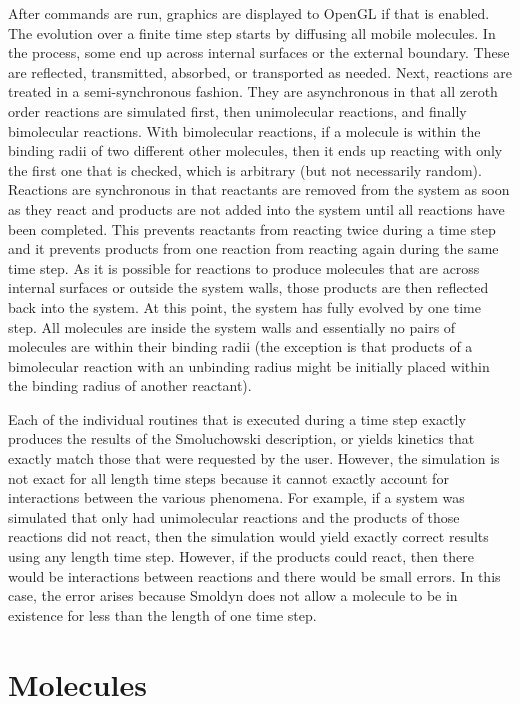 \documentclass {scrbook}
\begin{document}
After commands are run, graphics are displayed to OpenGL if that is enabled. The evolution over a finite time step starts by diffusing all mobile molecules. In the process, some end up across internal surfaces or the external boundary. These are reflected, transmitted, absorbed, or transported as needed. Next, reactions are treated in a semi-synchronous fashion. They are asynchronous in that all zeroth order reactions are simulated first, then unimolecular reactions, and finally bimolecular reactions. With bimolecular reactions, if a molecule is within the binding radii of two different other molecules, then it ends up reacting with only the first one that is checked, which is arbitrary (but not necessarily random). Reactions are synchronous in that reactants are removed from the system as soon as they react and products are not added into the system until all reactions have been completed. This prevents reactants from reacting twice during a time step and it prevents products from one reaction from reacting again during the same time step. As it is possible for reactions to produce molecules that are across internal surfaces or outside the system walls, those products are then reflected back into the system. At this point, the system has fully evolved by one time step. All molecules are inside the system walls and essentially no pairs of molecules are within their binding radii (the exception is that products of a bimolecular reaction with an unbinding radius might be initially placed within the binding radius of another reactant).

Each of the individual routines that is executed during a time step exactly produces the results of the Smoluchowski description, or yields kinetics that exactly match those that were requested by the user. However, the simulation is not exact for all length time steps because it cannot exactly account for interactions between the various phenomena. For example, if a system was simulated that only had unimolecular reactions and the products of those reactions did not react, then the simulation would yield exactly correct results using any length time step. However, if the products could react, then there would be interactions between reactions and there would be small errors. In this case, the error arises because Smoldyn does not allow a molecule to be in existence for less than the length of one time step.

\chapter{Molecules}
\end{document}
